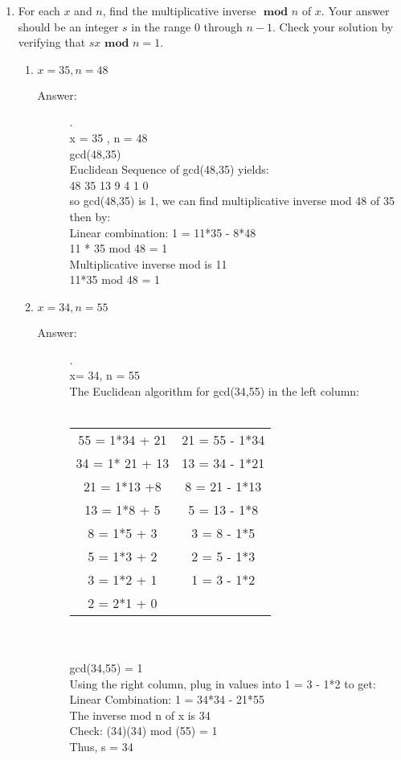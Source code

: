 \documentclass[12pt, oneside]{article}
\begin{document}
\begin{enumerate}
\item For each $x$ and $n$, find the multiplicative inverse $\textbf{ mod } n$ of $x$. Your answer should be an integer $s$ in the range $0$ through $n - 1$. Check your solution by verifying that $sx \textbf{ mod } n = 1$.
\begin{enumerate}
    \item $x = 35, n = 48$
    \begin{description}
      \item[Answer:] .\\
      x = 35 , n = 48\\
      gcd(48,35)\\
      Euclidean Sequence of gcd(48,35) yields:\\
      48	35	13	9	4	1	0\\
      so gcd(48,35) is 1, we can find multiplicative inverse mod 48 of 35 then by: \\

      Linear combination: 1 = 11*35 - 8*48\\

      11 * 35 mod 48 = 1\\
      Multiplicative inverse mod is 11\\

      11*35 mod 48 = 1
    \end{description}
    \item $x = 34, n = 55$
    \begin{description}
      \item[Answer:] .\\
      x= 34, n = 55\\
      The Euclidean algorithm for gcd(34,55) in the left column:\\\\
      \begin{tabular}{c|c}
        55 = 1*34 + 21 & 21 = 55 - 1*34\\
        34 = 1* 21 + 13 & 13 = 34 - 1*21\\
        21 = 1*13 +8 & 8 = 21 - 1*13\\
        13 = 1*8 + 5 & 5 = 13 - 1*8 \\
        8 = 1*5 + 3 & 3 = 8 - 1*5 \\
        5 = 1*3 + 2 & 2 = 5 - 1*3 \\
        3 = 1*2 + 1 & 1 = 3 - 1*2 \\
        2 = 2*1 + 0 &
      \end{tabular}\\\\
      gcd(34,55) = 1\\
      Using the right column, plug in values into 1 = 3 - 1*2 to get:\\
      Linear Combination: 1 = 34*34 - 21*55\\
      The inverse mod n of x is 34\\
      Check: (34)(34) mod (55) = 1\\
      Thus, s = 34
    \end{description}
\end{enumerate}


\quad



\end{enumerate}
\end{document}
